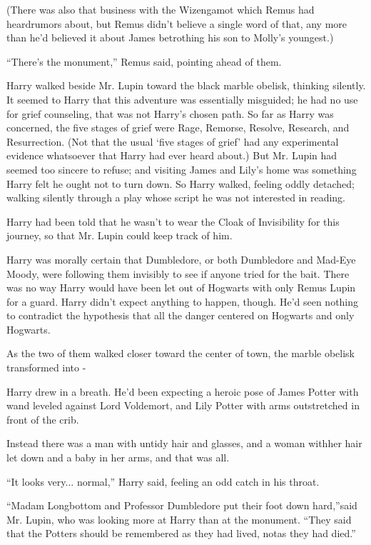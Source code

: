 (There was also that business with the Wizengamot which Remus had heardrumors about, but Remus didn't believe a single word of that, any more than he'd believed it about James betrothing his son to Molly's youngest.)

“There's the monument,” Remus said, pointing ahead of them.

\replacement{\sbreak}{}

Harry walked beside Mr. Lupin toward the black marble obelisk, thinking silently. It seemed to Harry that this adventure was essentially misguided; he had no use for grief counseling, that was not Harry's chosen path. So far as Harry was concerned, the five stages of grief were Rage, Remorse, Resolve, Research, and Resurrection. (Not that the usual `five stages of grief' had any experimental evidence whatsoever that Harry had ever heard about.) But Mr. Lupin had seemed too sincere to refuse; and visiting James and Lily's home was something Harry felt he ought not to turn down. So Harry walked, feeling oddly detached; walking silently through a play whose script he was not interested in reading.

Harry had been told that he wasn't to wear the Cloak of Invisibility for this journey, so that Mr. Lupin could keep track of him.

Harry was morally certain that Dumbledore, or both Dumbledore and Mad-Eye Moody, were following them invisibly to see if anyone tried for the bait. There was no way Harry would have been let out of Hogwarts with only Remus Lupin for a guard. Harry didn't expect anything to happen, though. He'd seen nothing to contradict the hypothesis that all the danger centered on Hogwarts and only Hogwarts.

As the two of them walked closer toward the center of town, the marble obelisk transformed into -

Harry drew in a breath. He'd been expecting a heroic pose of James Potter with wand leveled against Lord Voldemort, and Lily Potter with arms outstretched in front of the crib.

Instead there was a man with untidy hair and glasses, and a woman withher hair let down and a baby in her arms, and that was all.

“It looks very... normal,” Harry said, feeling an odd catch in his throat.

“Madam Longbottom and Professor Dumbledore put their foot down hard,”said Mr. Lupin, who was looking more at Harry than at the monument. “They said that the Potters should be remembered as they had lived, notas they had died.”

